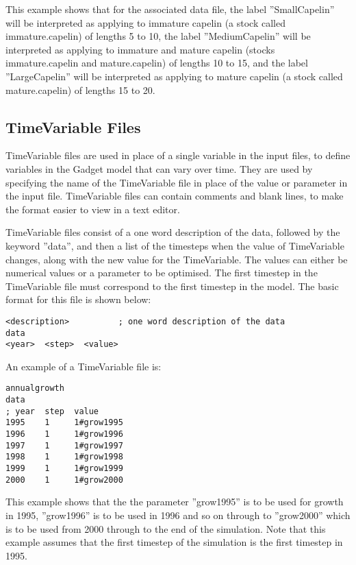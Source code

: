\documentclass [a4paper, 10pt]{book}
\begin{document}
This example shows that for the associated data file, the label ''SmallCapelin'' will be interpreted as applying to immature capelin (a stock called immature.capelin) of lengths 5 to 10, the label ''MediumCapelin'' will be interpreted as applying to immature and mature capelin (stocks immature.capelin and mature.capelin) of lengths 10 to 15, and the label ''LargeCapelin'' will be interpreted as applying to mature capelin (a stock called mature.capelin) of lengths 15 to 20.

\newpage %
\subsection{TimeVariable Files}
TimeVariable files are used in place of a single variable in the input files, to define variables in the Gadget model that can vary over time.  They are used by specifying the name of the TimeVariable file in place of the value or parameter in the input file.  TimeVariable files can contain comments and blank lines, to make the format easier to view in a text editor.

\bigskip
TimeVariable files consist of a one word description of the data, followed by the keyword ''data'', and then a list of the timesteps when the value of TimeVariable changes, along with the new value for the TimeVariable.  The values can either be numerical values or a parameter to be optimised.  The first timestep in the TimeVariable file must correspond to the first timestep in the model.  The basic format for this file is shown below:

{\small\begin{verbatim}
<description>          ; one word description of the data
data
<year>  <step>  <value>
\end{verbatim}}

An example of a TimeVariable file is:

{\small\begin{verbatim}
annualgrowth
data
; year  step  value
1995    1     1#grow1995
1996    1     1#grow1996
1997    1     1#grow1997
1998    1     1#grow1998
1999    1     1#grow1999
2000    1     1#grow2000
\end{verbatim}}

This example shows that the the parameter ''grow1995'' is to be used for growth in 1995, ''grow1996'' is to be used in 1996 and so on through to ''grow2000'' which is to be used from 2000 through to the end of the simulation.  Note that this example assumes that the first timestep of the simulation is the first timestep in 1995.
\end{document}
